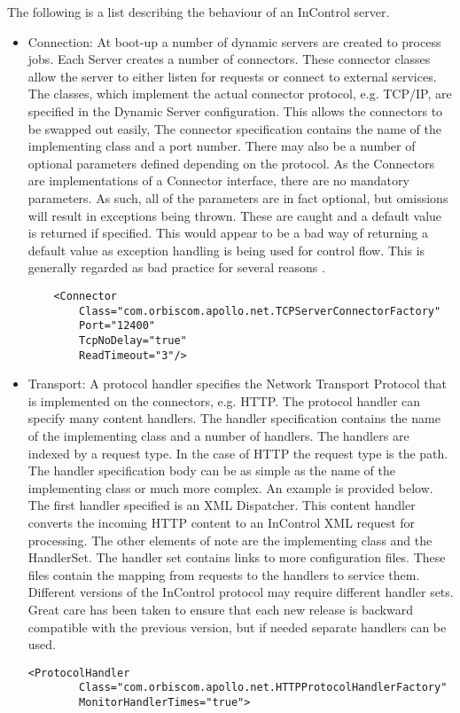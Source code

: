 \documentclass[a4paper, 11pt, titlepage]{article}
\begin{document}
The following is a list describing the behaviour of an InControl server. 
\begin{itemize} 
\item Connection: At boot-up a number of dynamic servers are created to process jobs. Each Server creates a number of connectors. These connector classes allow the server to either listen for requests or connect to external services. The classes, which implement the actual connector protocol, e.g. TCP/IP, are specified in the Dynamic Server configuration. This allows the connectors to be swapped out easily, The connector specification contains the name of the implementing class and a port number. There may also be a number of optional parameters defined depending on the protocol. As the Connectors are implementations of a Connector interface, there are no mandatory parameters. As such, all of the parameters are in fact optional, but omissions will result in exceptions being thrown. These are caught and a default value is returned if specified. This would appear to be a bad way of returning a default value as exception handling is being used for control flow. This is generally regarded as bad practice for several reasons \cite{effective_java}.
\begin{verbatim} 
    <Connector 
        Class="com.orbiscom.apollo.net.TCPServerConnectorFactory" 
        Port="12400" 
        TcpNoDelay="true"  
        ReadTimeout="3"/> 
\end{verbatim} 
\item Transport: A protocol handler specifies the Network Transport Protocol that is implemented on the connectors, e.g. HTTP. The protocol handler can specify many content handlers. The handler specification contains the name of the implementing class and a number of handlers. The handlers are indexed by a request type. In the case of HTTP the request type is the path. The handler specification body can be as simple as the name of the implementing class or much more complex. An example is provided below. The first handler specified is an XML Dispatcher. This content handler converts the incoming HTTP content to an InControl XML request for processing. The other elements of note are the implementing class and the HandlerSet. The handler set contains links to more configuration files. These files contain the mapping from requests to the handlers to service them. Different versions of the InControl protocol may require different handler sets. Great care has been taken to ensure that each new release is backward compatible with the previous version, but if needed separate handlers can be used. 
\begin{verbatim} 
<ProtocolHandler 
		Class="com.orbiscom.apollo.net.HTTPProtocolHandlerFactory" 
		MonitorHandlerTimes="true"> 
 

\end{verbatim}
\end{itemize}
\end{document}
